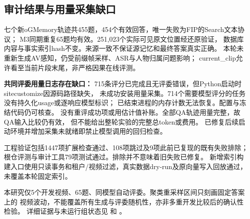 \subsection{审计结果与用量采集缺口}
七个新oGMemory轨迹共455题，454个有效回答，唯一失败为FIP的Search文本协议；
M3同期重复65题均有效。251,023个实际可见原文位置经还原验证，
数据库内容与事实索引hash不变。来源一致不保证源记忆和最终答案真实正确。
本轮未重新生成AV感知，仍受前缀帧采样、ASR与人物归属问题影响；
current\_clip允许看至当前片段末尾，非严格因果在线评测。

\textbf{共同评委用量日志存在缺口：}
715条评分已完成且无评委错误，但Python启动时sitecustomize因源码路径缺失，
未成功安装用量采集。714个需要模型评分的任务没有持久化usage或逐响应模型标识；
已结束进程的内存计数无法恢复。配置与冻结代码仍可核查。
没有重评成功项或用估计值补账。全部QA轨迹用量完整，故QA输入比较仍有效，
但不能给出整轮实验的完整总token或费用。
已修复后续启动环境并增加采集未就绪即禁止模型调用的回归检查。

工程验证包括1447项扩展检查通过、108项跳过及9项此前已复现的既有失败排除；
根仓评测与审计工具79项测试通过。排除并不意味着旧失败已修复。
新增索引构建入口使用只读事务和租户/视频过滤，真实数据dry-run及原向量写入回放通过，
未覆盖本轮固定索引。

本研究仅5个开发视频、65题、同模型自动评委。聚类重采样区间只刻画固定答案上的
视频波动，不能覆盖所有生成与评委随机性，亦非多重开发比较后的确认性检验。
详细证据与未运行组状态见
和
。
